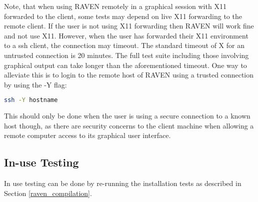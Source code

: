 Note, that when using RAVEN remotely in a graphical session with X11
forwarded to the client, some tests may depend on live X11 forwarding
to the remote client. If the user is not using X11 forwarding then
RAVEN will work fine and not use X11.  However, when the user has
forwarded their X11 environment to a ssh client, the connection may
timeout. The standard timeout of X for an untrusted connection is 20
minutes.  The full test suite including those involving graphical
output can take longer than the aforementioned timeout. One way to
alleviate this is to login to the remote host of RAVEN using a trusted
connection by using the -Y flag:

\begin{lstlisting}[language=bash]
ssh -Y hostname
\end{lstlisting}

This should only be done when the user is using a secure connection to
a known host though, as there are security concerns to the client
machine when allowing a remote computer access to its graphical user
interface.


\subsection{In-use Testing}

In use testing can be done by re-running the installation tests as
described in Section \ref{raven_compilation}.
